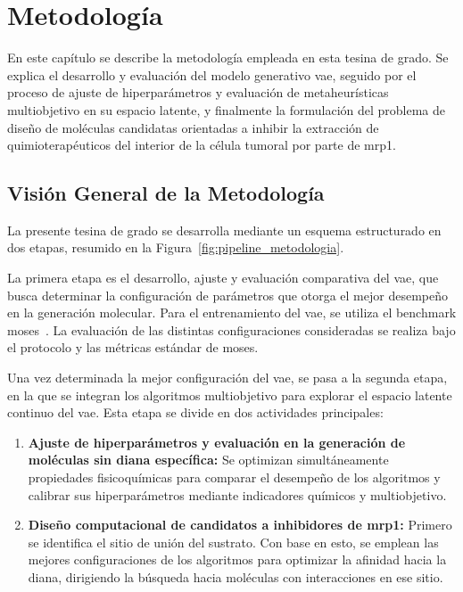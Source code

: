 \chapter{Metodología}
\label{ch:metodologia}

En este capítulo se describe la metodología empleada en esta tesina de grado. Se explica el desarrollo y evaluación del modelo generativo \gls{vae}, seguido por el proceso de ajuste de hiperparámetros y evaluación de metaheurísticas multiobjetivo en su espacio latente, y finalmente la formulación del problema de diseño de moléculas candidatas orientadas a inhibir la extracción de quimioterapéuticos del interior de la célula tumoral por parte de \gls{mrp1}.

\section{Visión General de la Metodología}
\label{sec:vision_general}


La presente tesina de grado se desarrolla mediante un esquema estructurado en dos etapas, resumido en la Figura~\ref{fig:pipeline_metodologia}.



La primera etapa es el desarrollo, ajuste y evaluación comparativa del \gls{vae}, que busca determinar la configuración de parámetros que otorga el mejor desempeño en la generación molecular. Para el entrenamiento del \gls{vae}, se utiliza el benchmark \gls{moses}~\cite{polykovskiy2020molecular}. La evaluación de las distintas configuraciones consideradas se realiza bajo el protocolo y las métricas estándar de \gls{moses}.

Una vez determinada la mejor configuración del \gls{vae}, se pasa a la segunda etapa, en la que se integran los algoritmos multiobjetivo para explorar el espacio latente continuo del \gls{vae}. Esta etapa se divide en dos actividades principales:

\begin{enumerate}
    \item \textbf{Ajuste de hiperparámetros y evaluación en la generación de moléculas sin diana específica:} Se optimizan simultáneamente propiedades fisicoquímicas para comparar el desempeño de los algoritmos y calibrar sus hiperparámetros mediante indicadores químicos y multiobjetivo.
    \item \textbf{Diseño computacional de candidatos a inhibidores de \gls{mrp1}:} Primero se identifica el sitio de unión del sustrato. Con base en esto, se emplean las mejores configuraciones de los algoritmos para optimizar la afinidad hacia la diana, dirigiendo la búsqueda hacia moléculas con interacciones en ese sitio.
\end{enumerate}


